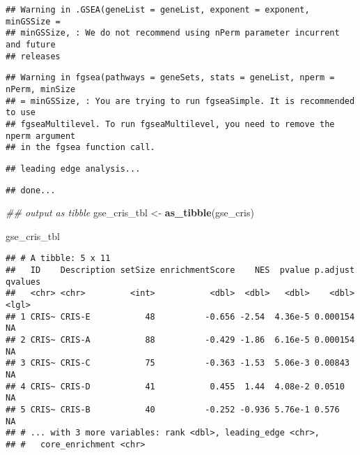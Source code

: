 \documentclass[
]{article}
\newenvironment{Shaded}{\begin{snugshade}}{\end{snugshade}}
\newcommand{\CommentTok}[1]{\textcolor[rgb]{0.56,0.35,0.01}{\textit{#1}}}
\newcommand{\DataTypeTok}[1]{\textcolor[rgb]{0.13,0.29,0.53}{#1}}
\newcommand{\DecValTok}[1]{\textcolor[rgb]{0.00,0.00,0.81}{#1}}
\newcommand{\KeywordTok}[1]{\textcolor[rgb]{0.13,0.29,0.53}{\textbf{#1}}}
\newcommand{\NormalTok}[1]{#1}
\newcommand{\OperatorTok}[1]{\textcolor[rgb]{0.81,0.36,0.00}{\textbf{#1}}}
\newcommand{\StringTok}[1]{\textcolor[rgb]{0.31,0.60,0.02}{#1}}
\begin{document}
\begin{verbatim}
## Warning in .GSEA(geneList = geneList, exponent = exponent, minGSSize =
## minGSSize, : We do not recommend using nPerm parameter incurrent and future
## releases
\end{verbatim}

\begin{verbatim}
## Warning in fgsea(pathways = geneSets, stats = geneList, nperm = nPerm, minSize
## = minGSSize, : You are trying to run fgseaSimple. It is recommended to use
## fgseaMultilevel. To run fgseaMultilevel, you need to remove the nperm argument
## in the fgsea function call.
\end{verbatim}

\begin{verbatim}
## leading edge analysis...
\end{verbatim}

\begin{verbatim}
## done...
\end{verbatim}

\begin{Shaded}
\begin{Highlighting}[]
\CommentTok{## output as tibble}
\NormalTok{gse_cris_tbl <-}\StringTok{ }\KeywordTok{as_tibble}\NormalTok{(gse_cris)}

\NormalTok{gse_cris_tbl}
\end{Highlighting}
\end{Shaded}

\begin{verbatim}
## # A tibble: 5 x 11
##   ID    Description setSize enrichmentScore    NES  pvalue p.adjust qvalues
##   <chr> <chr>         <int>           <dbl>  <dbl>   <dbl>    <dbl> <lgl>  
## 1 CRIS~ CRIS-E           48          -0.656 -2.54  4.36e-5 0.000154 NA     
## 2 CRIS~ CRIS-A           88          -0.429 -1.86  6.16e-5 0.000154 NA     
## 3 CRIS~ CRIS-C           75          -0.363 -1.53  5.06e-3 0.00843  NA     
## 4 CRIS~ CRIS-D           41           0.455  1.44  4.08e-2 0.0510   NA     
## 5 CRIS~ CRIS-B           40          -0.252 -0.936 5.76e-1 0.576    NA     
## # ... with 3 more variables: rank <dbl>, leading_edge <chr>,
## #   core_enrichment <chr>
\end{verbatim}

\begin{Shaded}
\end{Shaded}
\end{document}
